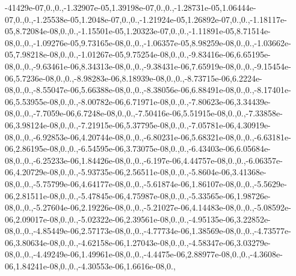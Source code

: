 \begin{DoxyCompactItemize}
-41429e-\/07,0.,0.,-\/1.\-32907e-\/05,1.\-39198e-\/07,0.,0.,-\/1.\-28731e-\/05,1.\-06444e-\/07,0.,0.,-\/1.\-25538e-\/05,1.\-2048e-\/07,0.,0.,-\/1.\-21924e-\/05,1.\-26892e-\/07,0.,0.,-\/1.\-18117e-\/05,8.\-72084e-\/08,0.,0.,-\/1.\-15501e-\/05,1.\-20323e-\/07,0.,0.,-\/1.\-11891e-\/05,8.\-71514e-\/08,0.,0.,-\/1.\-09276e-\/05,9.\-73165e-\/08,0.,0.,-\/1.\-06357e-\/05,8.\-98259e-\/08,0.,0.,-\/1.\-03662e-\/05,7.\-98218e-\/08,0.,0.,-\/1.\-01267e-\/05,9.\-75254e-\/08,0.,0.,-\/9.\-83416e-\/06,6.\-65195e-\/08,0.,0.,-\/9.\-63461e-\/06,8.\-34313e-\/08,0.,0.,-\/9.\-38431e-\/06,7.\-65919e-\/08,0.,0.,-\/9.\-15454e-\/06,5.\-7236e-\/08,0.,0.,-\/8.\-98283e-\/06,8.\-18939e-\/08,0.,0.,-\/8.\-73715e-\/06,6.\-2224e-\/08,0.,0.,-\/8.\-55047e-\/06,5.\-66388e-\/08,0.,0.,-\/8.\-38056e-\/06,6.\-88491e-\/08,0.,0.,-\/8.\-17401e-\/06,5.\-53955e-\/08,0.,0.,-\/8.\-00782e-\/06,6.\-71971e-\/08,0.,0.,-\/7.\-80623e-\/06,3.\-34439e-\/08,0.,0.,-\/7.\-7059e-\/06,6.\-7248e-\/08,0.,0.,-\/7.\-50416e-\/06,5.\-51915e-\/08,0.,0.,-\/7.\-33858e-\/06,3.\-98124e-\/08,0.,0.,-\/7.\-21915e-\/06,5.\-37795e-\/08,0.,0.,-\/7.\-05781e-\/06,4.\-30919e-\/08,0.,0.,-\/6.\-92853e-\/06,4.\-20744e-\/08,0.,0.,-\/6.\-80231e-\/06,5.\-68321e-\/08,0.,0.,-\/6.\-63181e-\/06,2.\-86195e-\/08,0.,0.,-\/6.\-54595e-\/06,3.\-73075e-\/08,0.,0.,-\/6.\-43403e-\/06,6.\-05684e-\/08,0.,0.,-\/6.\-25233e-\/06,1.\-84426e-\/08,0.,0.,-\/6.\-197e-\/06,4.\-44757e-\/08,0.,0.,-\/6.\-06357e-\/06,4.\-20729e-\/08,0.,0.,-\/5.\-93735e-\/06,2.\-56511e-\/08,0.,0.,-\/5.\-8604e-\/06,3.\-41368e-\/08,0.,0.,-\/5.\-75799e-\/06,4.\-64177e-\/08,0.,0.,-\/5.\-61874e-\/06,1.\-86107e-\/08,0.,0.,-\/5.\-5629e-\/06,2.\-81511e-\/08,0.,0.,-\/5.\-47845e-\/06,4.\-75987e-\/08,0.,0.,-\/5.\-33565e-\/06,1.\-98726e-\/08,0.,0.,-\/5.\-27604e-\/06,2.\-19226e-\/08,0.,0.,-\/5.\-21027e-\/06,4.\-14483e-\/08,0.,0.,-\/5.\-08592e-\/06,2.\-09017e-\/08,0.,0.,-\/5.\-02322e-\/06,2.\-39561e-\/08,0.,0.,-\/4.\-95135e-\/06,3.\-22852e-\/08,0.,0.,-\/4.\-85449e-\/06,2.\-57173e-\/08,0.,0.,-\/4.\-77734e-\/06,1.\-38569e-\/08,0.,0.,-\/4.\-73577e-\/06,3.\-80634e-\/08,0.,0.,-\/4.\-62158e-\/06,1.\-27043e-\/08,0.,0.,-\/4.\-58347e-\/06,3.\-03279e-\/08,0.,0.,-\/4.\-49249e-\/06,1.\-49961e-\/08,0.,0.,-\/4.\-4475e-\/06,2.\-88977e-\/08,0.,0.,-\/4.\-3608e-\/06,1.\-84241e-\/08,0.,0.,-\/4.\-30553e-\/06,1.\-6616e-\/08,0.,
\end{DoxyCompactItemize}
